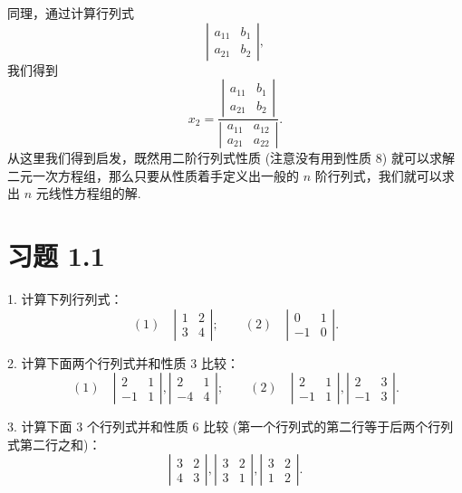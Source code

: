 \documentclass[UTF8, 12pt, fontset=fandol, oneside]{ctexart}
\begin{document}
同理，通过计算行列式
\[
\left|\begin{array}{cc}
a_{11} & b_1\\
a_{21} & b_2
\end{array}\right|,
\]
我们得到
\[
x_2=
\frac{
\left|\begin{array}{cc}
a_{11} & b_1\\
a_{21} & b_2
\end{array}\right|}
{\left|\begin{array}{cc}
a_{11} & a_{12}\\
a_{21} & a_{22}
\end{array}\right|}.
\]
从这里我们得到启发，既然用二阶行列式性质 (注意没有用到性质 8) 就可以求解二元一次方程组，那么只要从性质着手定义出一般的 $n$ 阶行列式，我们就可以求出 $n$ 元线性方程组的解.

\section*{习题 1.1}

1. 计算下列行列式：
\[
(1)\quad
\left|\begin{array}{cc}
1 & 2\\
3 & 4
\end{array}\right|;\qquad
(2)\quad
\left|\begin{array}{cc}
0 & 1\\
-1 & 0
\end{array}\right|.
\]

2. 计算下面两个行列式并和性质 3 比较：
\[
(1)\quad
\left|\begin{array}{cc}
2 & 1\\
-1 & 1
\end{array}\right|,
\left|\begin{array}{cc}
2 & 1\\
-4 & 4
\end{array}\right|;\qquad
(2)\quad
\left|\begin{array}{cc}
2 & 1\\
-1 & 1
\end{array}\right|,
\left|\begin{array}{cc}
2 & 3\\
-1 & 3
\end{array}\right|.
\]

3. 计算下面 3 个行列式并和性质 6 比较 (第一个行列式的第二行等于后两个行列式第二行之和)：
\[
\left|\begin{array}{cc}
3 & 2\\
4 & 3
\end{array}\right|,
\left|\begin{array}{cc}
3 & 2\\
3 & 1
\end{array}\right|,
\left|\begin{array}{cc}
3 & 2\\
1 & 2
\end{array}\right|.
\]
\end{document}
